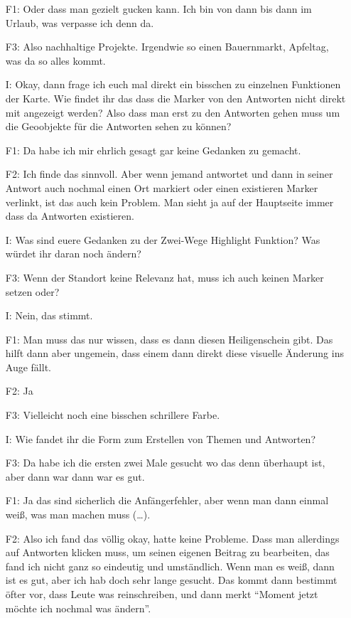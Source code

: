 \begin{itemize}
    \item[F1:] Oder dass man gezielt gucken kann. Ich bin von dann bis dann im Urlaub, was verpasse ich denn da.
    \item[F3:] Also nachhaltige Projekte. Irgendwie so einen Bauernmarkt, Apfeltag, was da so alles kommt.
    \item[I:] Okay, dann frage ich euch mal direkt ein bisschen zu einzelnen Funktionen der Karte. Wie findet ihr das dass die Marker von den Antworten nicht direkt mit angezeigt werden? Also dass man erst zu den Antworten gehen muss um die Geoobjekte f{\"u}r die Antworten sehen zu k{\"o}nnen?
    \item[F1:] Da habe ich mir ehrlich gesagt gar keine Gedanken zu gemacht.
    \item[F2:] Ich finde das sinnvoll. Aber wenn jemand antwortet und dann in seiner Antwort auch nochmal einen Ort markiert oder einen existieren Marker verlinkt, ist das auch kein Problem. Man sieht ja auf der Hauptseite immer dass da Antworten existieren.
    \item[I:] Was sind euere Gedanken zu der Zwei-Wege Highlight Funktion? Was w{\"u}rdet ihr daran noch {\"a}ndern?
    \item[F3:] Wenn der Standort keine Relevanz hat, muss ich auch keinen Marker setzen oder?
    \item[I:] Nein, das stimmt.
    \item[F1:] Man muss das nur wissen, dass es dann diesen Heiligenschein gibt. Das hilft dann aber ungemein, dass einem dann direkt diese visuelle {\"A}nderung ins Auge f{\"a}llt.
    \item[F2:] Ja
    \item[F3:] Vielleicht noch eine bisschen schrillere Farbe.
    \item[I:] Wie fandet ihr die Form zum Erstellen von Themen und Antworten?
    \item[F3:] Da habe ich die ersten zwei Male gesucht wo das denn {\"u}berhaupt ist, aber dann war dann war es gut.
    \item[F1:] Ja das sind sicherlich die Anf{\"a}ngerfehler, aber wenn man dann einmal wei{\ss}, was man machen muss (\dots).
    \item[F2:] Also ich fand das v{\"o}llig okay, hatte keine Probleme. Dass man allerdings auf Antworten klicken muss, um seinen eigenen Beitrag zu bearbeiten, das fand ich nicht ganz so eindeutig und umst{\"a}ndlich. Wenn man es wei{\ss}, dann ist es gut, aber ich hab doch sehr lange gesucht. Das kommt dann bestimmt {\"o}fter vor, dass Leute was reinschreiben, und dann merkt "`Moment jetzt m{\"o}chte ich nochmal was {\"a}ndern"'.

\end{itemize}
